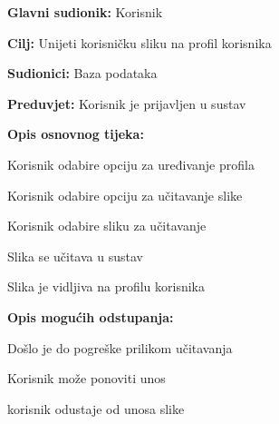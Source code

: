     \noindent {}
    \begin{packed_item}
    	
    	\item \textbf{Glavni sudionik: }Korisnik 
    	\item  \textbf{Cilj:} Unijeti korisničku sliku na profil korisnika
    	\item  \textbf{Sudionici:} Baza podataka
    	\item  \textbf{Preduvjet:} Korisnik je prijavljen u sustav
    	\item  \textbf{Opis osnovnog tijeka:}
    	
    	\item[] \begin{packed_enum}
    		
    		\item Korisnik odabire opciju za uređivanje profila
    		\item Korisnik odabire opciju za učitavanje slike
    		\item Korisnik odabire sliku za učitavanje
    		\item Slika se učitava u sustav
    		\item Slika je vidljiva na profilu korisnika
    		
    	\end{packed_enum}
    	
    	\item  \textbf{Opis mogućih odstupanja:}
    	
    	\item[] \begin{packed_item}
    		
    		\item[2.a] Došlo je do pogreške prilikom učitavanja
    		\item[] \begin{packed_enum}
    			
    			\item Korisnik može ponoviti unos 
    			\item korisnik odustaje od unosa slike
    			
    		\end{packed_enum}
    		
    	\end{packed_item}
    \end{packed_item}

